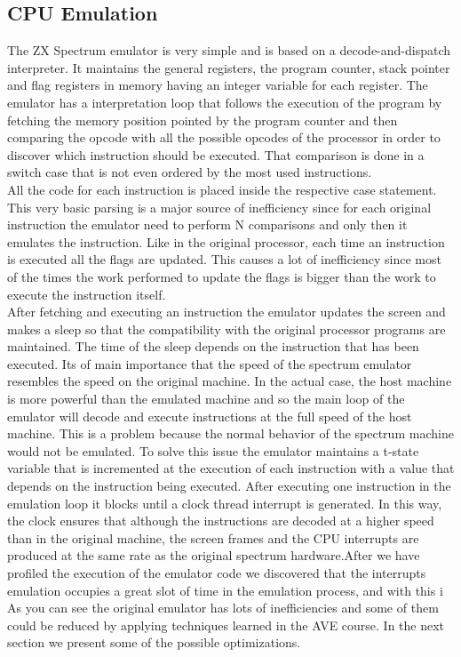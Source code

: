 \subsection{CPU Emulation}
The ZX Spectrum emulator is very simple and is based on a decode-and-dispatch interpreter. It maintains the general registers, the program counter, stack pointer and flag registers in memory having an integer variable for each register.
The emulator has a interpretation loop that follows the execution of the program by fetching the memory position pointed by the program counter and then comparing the opcode with all the possible opcodes of the processor in order to discover which instruction should be executed. That comparison is done in a switch case that is not even ordered by the most used instructions.\\
\indent All the code for each instruction is placed inside the respective case statement. This very basic parsing is a major source of inefficiency since for each original instruction the emulator need to perform N comparisons and only then it emulates the instruction. 
Like in the original processor, each time an instruction is executed all the flags are updated. This causes a lot of inefficiency since most of the times the work performed to update the flags is bigger than the work to execute the instruction itself.\\
\indent After fetching and executing an instruction the emulator updates the screen and makes a sleep so that the compatibility with the original processor programs are maintained. The time of the sleep depends on the instruction that has been executed.
Its of main importance that the speed of the spectrum emulator resembles the  speed on the original machine. In the actual case, the host machine is more powerful than the emulated machine and so the main loop of the emulator will  decode and execute instructions at the full speed of the host machine. This is a problem because the normal behavior of the spectrum machine would not be emulated. To solve this issue the emulator maintains a t-state variable that is incremented at the execution of each instruction with a value that depends on the instruction being executed. After executing one instruction in the emulation loop it blocks until a clock thread interrupt is generated. In this way, the clock ensures that although the instructions are decoded at a higher speed than in the original machine, the screen frames and the CPU interrupts are produced at the same rate as the original spectrum hardware.After we have profiled the execution of the emulator code we discovered that the interrupts emulation occupies a great slot of time in the emulation process, and with this i
As you can see the original emulator has lots of inefficiencies and some of them could be reduced by applying techniques learned in the AVE course. In the next section we present some of the possible optimizations.

